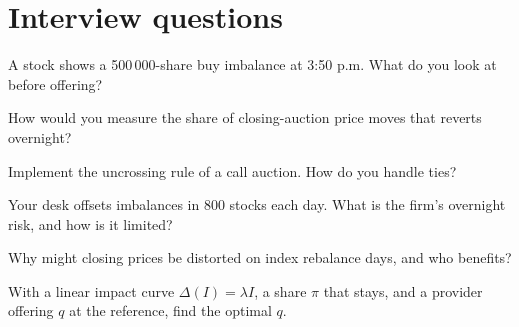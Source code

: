 \section{Interview questions}

\begin{interviewq}\label{iq:hf:auctions-and-the-close:1}
A stock shows a 500\,000-share buy imbalance at 3:50 p.m. What do you look at before offering?
\end{interviewq}

\begin{interviewq}\label{iq:hf:auctions-and-the-close:2}
How would you measure the share of closing-auction price moves that reverts overnight?
\end{interviewq}

\begin{interviewq}\label{iq:hf:auctions-and-the-close:3}
Implement the uncrossing rule of a call auction. How do you handle ties?
\end{interviewq}

\begin{interviewq}\label{iq:hf:auctions-and-the-close:4}
Your desk offsets imbalances in 800 stocks each day. What is the firm's overnight risk, and how is it limited?
\end{interviewq}

\begin{interviewq}\label{iq:hf:auctions-and-the-close:5}
Why might closing prices be distorted on index rebalance days, and who benefits?
\end{interviewq}

\begin{interviewq}\label{iq:hf:auctions-and-the-close:6}
With a linear impact curve $\Delta(I)=\lambda I$, a share $\pi$ that stays, and a provider offering $q$ at the reference, find the optimal $q$.
\end{interviewq}
